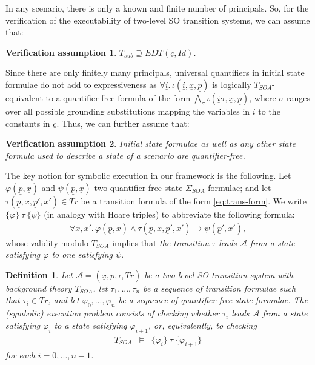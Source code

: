 \documentclass[conference]{IEEEtran}
\newtheorem{definition}{Definition}
\newtheorem{verification-assumption}{Verification assumption}
\newcommand{\close}{\IEEEQEDclosed}
\begin{document}
In any scenario, there is only a known and finite number of principals. So, for the verification of the executability of two-level SO transition systems, 
we can assume that:
\begin{verification-assumption}
$T_\mathit{sub} \supseteq EDT(\underline{c}, \mathit{Id})$. \hfill \close
\end{verification-assumption}
Since there are only finitely many principals, universal quantifiers in initial state formulae do not add to expressiveness as $\forall \underline{i}.\, \iota(\underline{i},\underline{x},\underline{p})$ is logically $T_\mathit{SOA}$-equivalent to a quantifier-free formula of the form $\bigwedge_{\sigma} \iota(\underline{i}\sigma,\underline{x},\underline{p})$,
where $\sigma$ ranges over all possible grounding substitutions mapping the variables in $\underline{i}$ to the constants in $\underline{c}$.  Thus, we can further assume that:
\begin{verification-assumption}
Initial state formulae as well as any other state formula used to describe a state of a scenario are quantifier-free. \hfill \close
\end{verification-assumption}

The key notion for symbolic execution in our framework is the following. Let $\varphi(\underline{p},\underline{x})$ and $\psi(\underline{p},\underline{x})$ two quantifier-free state $\Sigma_\mathit{SOA}$-formulae; and let $\tau(\underline{p},\underline{x},\underline{p}',\underline{x}')\in \mathit{Tr}$ be a transition formula of the form \eqref{eq:trans-form}.  We write $\{\varphi\}~\tau~\{\psi\}$ (in analogy with Hoare triples) to abbreviate the following formula:
\begin{eqnarray}
  \label{eq:vc-val}
  \forall \underline{x},\underline{x}'.\,
  \varphi(\underline{p},\underline{x}) \wedge
  \tau(\underline{p},\underline{x},\underline{p}',\underline{x}') 
  \rightarrow
  \psi(\underline{p}',\underline{x}') ,
\end{eqnarray}
whose validity modulo $T_\mathit{SOA}$ implies that \emph{the transition $\tau$ leads 
$\mathcal{A}$ from a state satisfying $\varphi$ to one satisfying $\psi$}.
\begin{definition}
  Let $\mathcal{A}=(\underline{x},\underline{p},\iota,Tr)$ be a two-level SO
  transition system with background theory $T_\mathit{SOA}$, let $\tau_1, ..., \tau_n$
  be a sequence of transition formulae such that $\tau_i\in Tr$, and let
  $\varphi_0, ..., \varphi_n$ be a sequence of quantifier-free state
  formulae. The \emph{(symbolic) execution problem} consists of
  checking whether $\tau_i$ leads $\mathcal{A}$ from a state
  satisfying $\varphi_i$ to a state satisfying $\varphi_{i+1}$, or,
  equivalently, to checking
  \begin{eqnarray*}
    T_\mathit{SOA} & \models & \{\varphi_i\}~\tau~\{\varphi_{i+1}\} 
  \end{eqnarray*}
  for each $i=0, ..., n-1$. \hfill \close
\end{definition}
\end{document}
